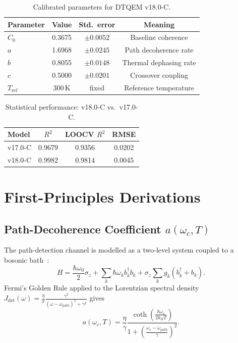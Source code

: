 \documentclass[reprint,amsmath,amssymb,aps,pra,superscriptaddress]{revtex4-2}
\begin{document}
\begin{table}[h]
\caption{Calibrated parameters for DTQEM v18.0-C.}
\label{tab:parameters}
\begin{ruledtabular}
\begin{tabular}{lccc}
Parameter & Value & Std.\ error & Meaning\\\hline
$C_0$            & 0.3675 & $\pm0.0052$ & Baseline coherence\\
$a$              & 1.6968 & $\pm0.0245$ & Path decoherence rate\\
$b$              & 0.8055 & $\pm0.0148$ & Thermal dephasing rate\\
$c$              & 0.5000 & $\pm0.0201$ & Crossover coupling\\
$T_{\text{ref}}$ & 300\,K & fixed       & Reference temperature\\
\end{tabular}
\end{ruledtabular}
\end{table}

\begin{table}[h]
\caption{Statistical performance: v18.0-C vs.\ v17.0-C.}
\label{tab:performance}
\begin{ruledtabular}
\begin{tabular}{lccc}
Model   & $R^2$  & LOOCV $R^2$ & RMSE\\\hline
v17.0-C & 0.9679 & 0.9356      & 0.0202\\
v18.0-C & 0.9982 & 0.9814      & 0.0045\\
\end{tabular}
\end{ruledtabular}
\end{table}

\section{First-Principles Derivations}
\subsection{Path-Decoherence Coefficient $a(\omega_c,T)$}
The path-detection channel is modelled as a two-level system coupled to a
bosonic bath~\cite{weiss2012}:
\begin{equation}
  H=\frac{\hbar\omega_0}{2}\sigma_z
   +\sum_k\hbar\omega_k b_k^\dagger b_k
   +\sigma_z\sum_k g_k(b_k^\dagger+b_k).
\end{equation}
Fermi's Golden Rule applied to the Lorentzian spectral density
$J_{\text{det}}(\omega)=\frac{\eta}{\pi}
  \frac{\gamma^2}{(\omega-\omega_{\text{path}})^2+\gamma^2}$
gives
\begin{equation}
  a(\omega_c,T)=\frac{\eta}{\gamma}
    \frac{\coth\!\left(\frac{\hbar\omega_c}{2k_BT}\right)}
         {1+\left(\frac{\omega_c-\omega_{\text{path}}}{\gamma}\right)^2}.
  \label{eq:a_micro}
\end{equation}
\end{document}
